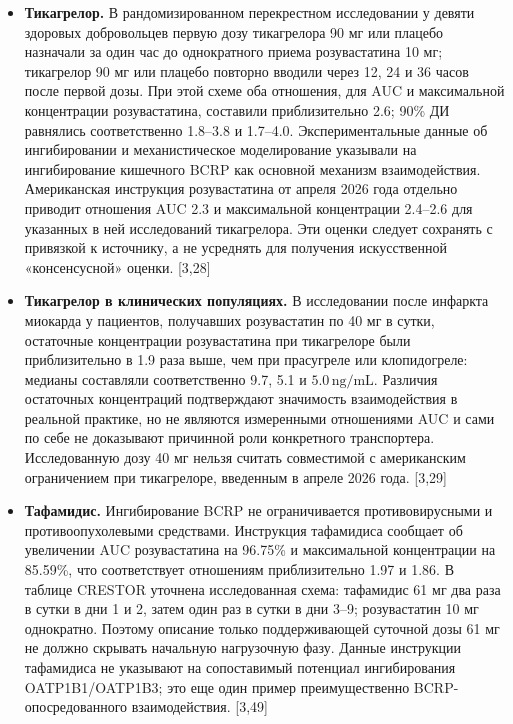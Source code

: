 \documentclass[11pt]{article}
\begin{document}
\begin{itemize}
\item \textbf{Тикагрелор.} В рандомизированном перекрестном исследовании у девяти здоровых добровольцев первую дозу тикагрелора 90 мг или плацебо назначали за один час до однократного приема розувастатина 10 мг; тикагрелор 90 мг или плацебо повторно вводили через 12, 24 и 36 часов после первой дозы. При этой схеме оба отношения, для AUC и максимальной концентрации розувастатина, составили приблизительно 2.6; 90\% ДИ равнялись соответственно 1.8--3.8 и 1.7--4.0. Экспериментальные данные об ингибировании и механистическое моделирование указывали на ингибирование кишечного BCRP как основной механизм взаимодействия. Американская инструкция розувастатина от апреля 2026 года отдельно приводит отношения AUC 2.3 и максимальной концентрации 2.4--2.6 для указанных в ней исследований тикагрелора. Эти оценки следует сохранять с привязкой к источнику, а не усреднять для получения искусственной «консенсусной» оценки. [3,28]
\item \textbf{Тикагрелор в клинических популяциях.} В исследовании после инфаркта миокарда у пациентов, получавших розувастатин по 40 мг в сутки, остаточные концентрации розувастатина при тикагрелоре были приблизительно в 1.9 раза выше, чем при прасугреле или клопидогреле: медианы составляли соответственно 9.7, 5.1 и \(5.0\,\mathrm{ng/mL}\). Различия остаточных концентраций подтверждают значимость взаимодействия в реальной практике, но не являются измеренными отношениями AUC и сами по себе не доказывают причинной роли конкретного транспортера. Исследованную дозу 40 мг нельзя считать совместимой с американским ограничением при тикагрелоре, введенным в апреле 2026 года. [3,29]
\item \textbf{Тафамидис.} Ингибирование BCRP не ограничивается противовирусными и противоопухолевыми средствами. Инструкция тафамидиса сообщает об увеличении AUC розувастатина на 96.75\% и максимальной концентрации на 85.59\%, что соответствует отношениям приблизительно 1.97 и 1.86. В таблице CRESTOR уточнена исследованная схема: тафамидис 61 мг два раза в сутки в дни 1 и 2, затем один раз в сутки в дни 3--9; розувастатин 10 мг однократно. Поэтому описание только поддерживающей суточной дозы 61 мг не должно скрывать начальную нагрузочную фазу. Данные инструкции тафамидиса не указывают на сопоставимый потенциал ингибирования OATP1B1/OATP1B3; это еще один пример преимущественно BCRP-опосредованного взаимодействия. [3,49]

\end{itemize}
\end{document}

